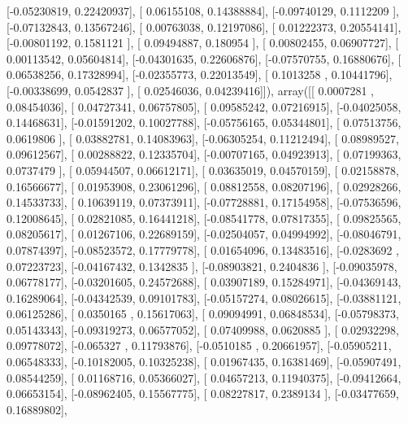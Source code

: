 \documentclass{article}
\begin{document}
       [-0.05230819,  0.22420937],
       [ 0.06155108,  0.14388884],
       [-0.09740129,  0.1112209 ],
       [-0.07132843,  0.13567246],
       [ 0.00763038,  0.12197086],
       [ 0.01222373,  0.20554141],
       [-0.00801192,  0.1581121 ],
       [ 0.09494887,  0.180954  ],
       [ 0.00802455,  0.06907727],
       [ 0.00113542,  0.05604814],
       [-0.04301635,  0.22606876],
       [-0.07570755,  0.16880676],
       [ 0.06538256,  0.17328994],
       [-0.02355773,  0.22013549],
       [ 0.1013258 ,  0.10441796],
       [-0.00338699,  0.0542837 ],
       [ 0.02546036,  0.04239416]]), array([[ 0.0007281 ,  0.08454036],
       [ 0.04727341,  0.06757805],
       [ 0.09585242,  0.07216915],
       [-0.04025058,  0.14468631],
       [-0.01591202,  0.10027788],
       [-0.05756165,  0.05344801],
       [ 0.07513756,  0.0619806 ],
       [ 0.03882781,  0.14083963],
       [-0.06305254,  0.11212494],
       [ 0.08989527,  0.09612567],
       [ 0.00288822,  0.12335704],
       [-0.00707165,  0.04923913],
       [ 0.07199363,  0.0737479 ],
       [ 0.05944507,  0.06612171],
       [ 0.03635019,  0.04570159],
       [ 0.02158878,  0.16566677],
       [ 0.01953908,  0.23061296],
       [ 0.08812558,  0.08207196],
       [ 0.02928266,  0.14533733],
       [ 0.10639119,  0.07373911],
       [-0.07728881,  0.17154958],
       [-0.07536596,  0.12008645],
       [ 0.02821085,  0.16441218],
       [-0.08541778,  0.07817355],
       [ 0.09825565,  0.08205617],
       [ 0.01267106,  0.22689159],
       [-0.02504057,  0.04994992],
       [-0.08046791,  0.07874397],
       [-0.08523572,  0.17779778],
       [ 0.01654096,  0.13483516],
       [-0.0283692 ,  0.07223723],
       [-0.04167432,  0.1342835 ],
       [-0.08903821,  0.2404836 ],
       [-0.09035978,  0.06778177],
       [-0.03201605,  0.24572688],
       [ 0.03907189,  0.15284971],
       [-0.04369143,  0.16289064],
       [-0.04342539,  0.09101783],
       [-0.05157274,  0.08026615],
       [-0.03881121,  0.06125286],
       [ 0.0350165 ,  0.15617063],
       [ 0.09094991,  0.06848534],
       [-0.05798373,  0.05143343],
       [-0.09319273,  0.06577052],
       [ 0.07409988,  0.0620885 ],
       [ 0.02932298,  0.09778072],
       [-0.065327  ,  0.11793876],
       [-0.0510185 ,  0.20661957],
       [-0.05905211,  0.06548333],
       [-0.10182005,  0.10325238],
       [ 0.01967435,  0.16381469],
       [-0.05907491,  0.08544259],
       [ 0.01168716,  0.05366027],
       [ 0.04657213,  0.11940375],
       [-0.09412664,  0.06653154],
       [-0.08962405,  0.15567775],
       [ 0.08227817,  0.2389134 ],
       [-0.03477659,  0.16889802],
\end{document}
